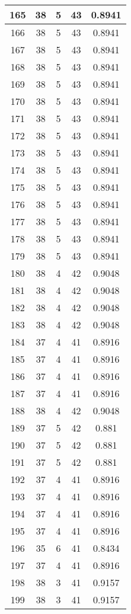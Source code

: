\documentclass[letterpaper, 12pt]{article}
\begin{document}
\begin{longtable}{|c|c|c|c|c|}
\hline
165 & 38 & 5 & 43 & 0.8941 \\
\hline
166 & 38 & 5 & 43 & 0.8941 \\
\hline
167 & 38 & 5 & 43 & 0.8941 \\
\hline
168 & 38 & 5 & 43 & 0.8941 \\
\hline
169 & 38 & 5 & 43 & 0.8941 \\
\hline
170 & 38 & 5 & 43 & 0.8941 \\
\hline
171 & 38 & 5 & 43 & 0.8941 \\
\hline
172 & 38 & 5 & 43 & 0.8941 \\
\hline
173 & 38 & 5 & 43 & 0.8941 \\
\hline
174 & 38 & 5 & 43 & 0.8941 \\
\hline
175 & 38 & 5 & 43 & 0.8941 \\
\hline
176 & 38 & 5 & 43 & 0.8941 \\
\hline
177 & 38 & 5 & 43 & 0.8941 \\
\hline
178 & 38 & 5 & 43 & 0.8941 \\
\hline
179 & 38 & 5 & 43 & 0.8941 \\
\hline
180 & 38 & 4 & 42 & 0.9048 \\
\hline
181 & 38 & 4 & 42 & 0.9048 \\
\hline
182 & 38 & 4 & 42 & 0.9048 \\
\hline
183 & 38 & 4 & 42 & 0.9048 \\
\hline
184 & 37 & 4 & 41 & 0.8916 \\
\hline
185 & 37 & 4 & 41 & 0.8916 \\
\hline
186 & 37 & 4 & 41 & 0.8916 \\
\hline
187 & 37 & 4 & 41 & 0.8916 \\
\hline
188 & 38 & 4 & 42 & 0.9048 \\
\hline
189 & 37 & 5 & 42 & 0.881 \\
\hline
190 & 37 & 5 & 42 & 0.881 \\
\hline
191 & 37 & 5 & 42 & 0.881 \\
\hline
192 & 37 & 4 & 41 & 0.8916 \\
\hline
193 & 37 & 4 & 41 & 0.8916 \\
\hline
194 & 37 & 4 & 41 & 0.8916 \\
\hline
195 & 37 & 4 & 41 & 0.8916 \\
\hline
196 & 35 & 6 & 41 & 0.8434 \\
\hline
197 & 37 & 4 & 41 & 0.8916 \\
\hline
198 & 38 & 3 & 41 & 0.9157 \\
\hline
199 & 38 & 3 & 41 & 0.9157 \\
\hline
\end{longtable}
\end{document}
